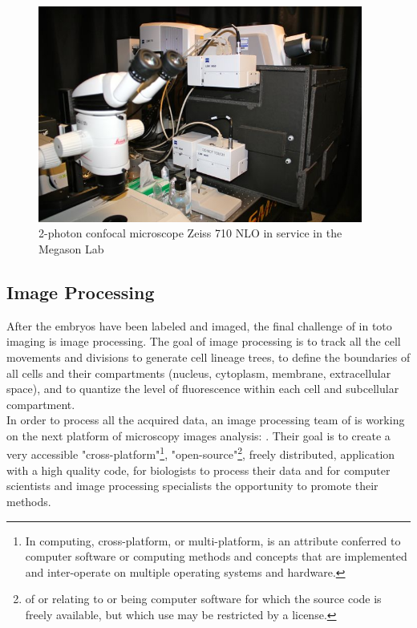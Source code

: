 \begin{figure}[htb]
\begin{center}
\leavevmode
 \includegraphics[width=0.95\textwidth]{pictures/PICmicroscope}
\end{center}
\caption{2-photon confocal microscope Zeiss 710 NLO in service in the Megason
Lab}
\label{fig:MicMegason}
\end{figure}


\subsection{Image Processing}

After the embryos have been labeled and imaged, the final challenge of in toto
imaging is image processing. The goal of image processing is to track all the
cell movements and divisions to generate cell lineage trees, to define the
boundaries of all cells and their compartments (nucleus, cytoplasm, membrane,
extracellular space), and to quantize the level of fluorescence within each
cell and subcellular compartment.\\

In order to process all the acquired data, an image processing team of
is working on the next platform of microscopy images analysis: {\gofigure}.
Their goal is to create a very accessible "cross-platform"\footnote{In
computing, cross-platform, or multi-platform, is
an attribute conferred to computer software or computing methods and concepts
that are implemented and inter-operate on multiple operating systems and
hardware.}, "open-source"\footnote{of or
relating to or being computer software for which
the source code is freely available, but which use may be restricted by a
license.}, freely distributed, application with a high quality code, for
biologists to process their data and for computer scientists and image
processing specialists the opportunity to promote their methods.

